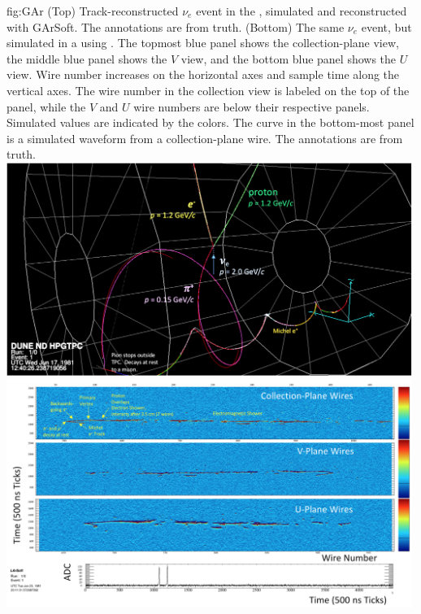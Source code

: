 \begin{dunefigure}{fig:GAr}
{(Top) Track-reconstructed $\nu_e$  event in the , simulated and reconstructed with GArSoft.  The annotations are from  truth. (Bottom) The same $\nu_e$  event, but simulated in a  using .  The topmost blue panel shows the collection-plane view, the middle blue panel shows the $V$ view, and the bottom blue panel shows the $U$ view.  Wire number increases on the horizontal axes and sample time along the vertical axes.   The wire number in the collection view is labeled on the top of the panel, while the $V$ and $U$ wire numbers are below their respective panels. Simulated  values are indicated by the colors.  The curve in the bottom-most panel is a simulated waveform from a collection-plane wire.  The annotations are from  truth.}
    \includegraphics[width=0.99\textwidth]{graphics/Garsoft_evt.png}
    \includegraphics[width=0.99\textwidth]{graphics/nuenppinliquid.png}
\end{dunefigure}
%
%

